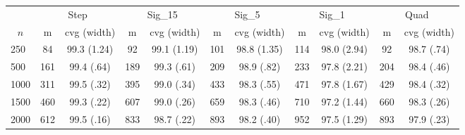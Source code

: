 \begin{tabular}{lcccccccccc}
   \toprule
 
           & \multicolumn{2}{c}{Step}& \multicolumn{2}{c}{Sig\_15}& \multicolumn{2}{c}{Sig\_5}& \multicolumn{2}{c}{Sig\_1}& \multicolumn{2}{c}{Quad} \\ 
             \cmidrule(l{2pt}r{2pt}){2-3} \cmidrule(l{2pt}r{2pt}){4-5} \cmidrule(l{2pt}r{2pt}){6-7} \cmidrule(l{2pt}r{2pt}){8-9}  \cmidrule(l{2pt}r{2pt}){10-11} 
             \multicolumn{1}{c}{$n$} & \multicolumn{1}{c}{m}& \multicolumn{1}{c}{cvg (width)}& \multicolumn{1}{c}{m}& \multicolumn{1}{c}{cvg (width)}& \multicolumn{1}{c}{m}& \multicolumn{1}{c}{cvg (width)}& \multicolumn{1}{c}{m}& \multicolumn{1}{c}{cvg (width)}& \multicolumn{1}{c}{m}& \multicolumn{1}{c}{cvg (width)} \\ \midrule 
        250 & 84 & 99.3 (1.24) & 92 & 99.1 (1.19) & 101 & 98.8 (1.35) & 114 & 98.0 (2.94) & 92 & 98.7 (.74) \\ 
  500 & 161 & 99.4 (.64) & 189 & 99.3 (.61) & 209 & 98.9 (.82) & 233 & 97.8 (2.21) & 204 & 98.4 (.46) \\ 
  1000 & 311 & 99.5 (.32) & 395 & 99.0 (.34) & 433 & 98.3 (.55) & 471 & 97.8 (1.67) & 429 & 98.4 (.32) \\ 
  1500 & 460 & 99.3 (.22) & 607 & 99.0 (.26) & 659 & 98.3 (.46) & 710 & 97.2 (1.44) & 660 & 98.3 (.26) \\ 
  2000 & 612 & 99.5 (.16) & 833 & 98.7 (.22) & 893 & 98.2 (.40) & 952 & 97.5 (1.29) & 893 & 97.9 (.23) \\ 
   \hline
\end{tabular}
